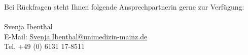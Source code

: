 \documentclass[10pt, a4paper]{article}
\begin{document}
  
    
  
  \vspace*{1cm}
  \noindent
  Bei Rückfragen steht Ihnen folgende Ansprechpartnerin gerne zur Verfügung:\\ \\
  Svenja Ibenthal \\
  E-Mail: \href{mailto:Svenja.Ibenthal@unimedizin-mainz.de}{Svenja.Ibenthal@unimedizin-mainz.de} \\
  Tel. +49 (0) 6131 17-8511
  
  
\end{document}
